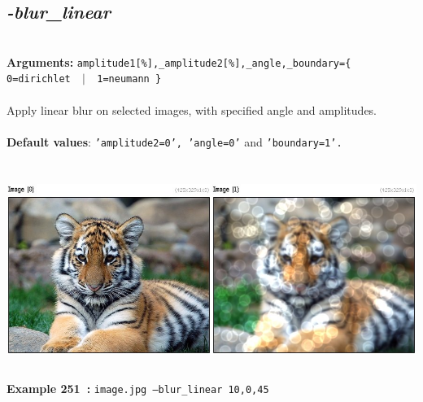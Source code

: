 \documentclass[a4paper,11pt,twoside]{book}
\begin{document}
\subsection{\emph{-blur\_linear} }\vspace*{-0.5em}
~\\\textbf{Arguments: } 
{\small \texttt{amplitude1[\%],\_amplitude2[\%],\_angle,\_boundary=\{ 0=dirichlet ~$|$~ 1=neumann \}}}\\~\\
Apply linear blur on selected images, with specified angle and amplitudes.
~\\~\\\textbf{Default values}: {\small \texttt{'amplitude2=0', 'angle=0'} and \texttt{'boundary=1'.}}
\begin{center}\includegraphics[keepaspectratio=true,height=7cm,width=\textwidth]{img/gmic_def251.jpg}\\
{\footnotesize \textbf{Example 251~:} \texttt{image.jpg --blur\_linear 10,0,45}}
\end{center}
\end{document}
